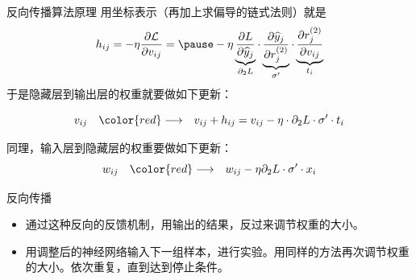
\begin{frame}

\begin{block}{反向传播算法原理}
用坐标表示（再加上求偏导的链式法则）就是
\[h_{ij} = -\eta\dfrac{\partial\mathcal{L}}{\partial v_{ij}} = \pause -\eta \underbrace{\dfrac{\partial L}{\partial \widehat{y}_j}}_{\partial_2 L} \cdot \underbrace{\dfrac{\partial \widehat{y}_j}{\partial r_j^{(2)}}}_{\sigma'} \cdot \underbrace{\dfrac{\partial r_j^{(2)}}{\partial v_{ij}}}_{t_i}\]
于是隐藏层到输出层的权重就要做如下更新：

\pause

\[v_{ij} \quad{\color{red}\longrightarrow\quad} v_{ij} + h_{ij} = v_{ij} - \eta \cdot \partial_2 L \cdot \sigma' \cdot t_i\]


\pause

同理，输入层到隐藏层的权重要做如下更新：
\[w_{ij} \quad{\color{red}\longrightarrow\quad} w_{ij} - \eta \partial_2 L \cdot \sigma' \cdot x_i\]
\end{block}

\end{frame}


\begin{frame}

\begin{block}{反向传播}
\begin{itemize}
\item 通过这种反向的反馈机制，用输出的结果，反过来调节权重的大小。
\vspace{1em}
\pause
\item 用调整后的神经网络输入下一组样本，进行实验。用同样的方法再次调节权重的大小。依次重复，直到达到停止条件。
\end{itemize}

\end{block}

\end{frame}


